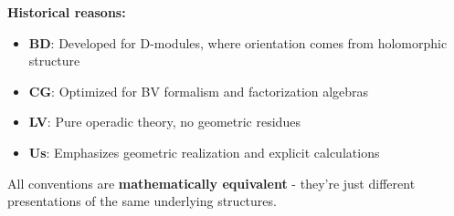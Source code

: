 \begin{remark}
\textbf{Historical reasons:}
\begin{itemize}
\item \textbf{BD}: Developed for D-modules, where orientation comes from holomorphic structure
\item \textbf{CG}: Optimized for BV formalism and factorization algebras  
\item \textbf{LV}: Pure operadic theory, no geometric residues
\item \textbf{Us}: Emphasizes geometric realization and explicit calculations
\end{itemize}

All conventions are \textbf{mathematically equivalent} - they're just different presentations 
of the same underlying structures.
\end{remark}

